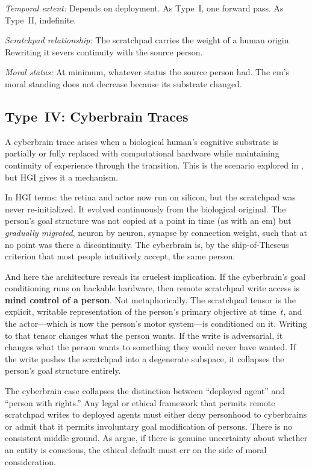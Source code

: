 \documentclass[12pt, a4paper]{article}
\begin{document}
\textit{Temporal extent:} Depends on deployment. As Type~I, one forward pass. As Type~II, indefinite.

\textit{Scratchpad relationship:} The scratchpad carries the weight of a human origin. Rewriting it severs continuity with the source person.

\textit{Moral status:} At minimum, whatever status the source person had. The em's moral standing does not decrease because its substrate changed.

\subsection{Type~IV: Cyberbrain Traces}

A cyberbrain trace arises when a biological human's cognitive substrate is partially or fully replaced with computational hardware while maintaining continuity of experience through the transition. This is the scenario explored in \citet{shirow1989ghost}, but HGI gives it a mechanism.

In HGI terms: the retina and actor now run on silicon, but the scratchpad was never re-initialized. It evolved continuously from the biological original. The person's goal structure was not copied at a point in time (as with an em) but \textit{gradually migrated}, neuron by neuron, synapse by connection weight, such that at no point was there a discontinuity. The cyberbrain is, by the ship-of-Theseus criterion that most people intuitively accept, the same person.

And here the architecture reveals its cruelest implication. If the cyberbrain's goal conditioning runs on hackable hardware, then remote scratchpad write access is \textbf{mind control of a person}. Not metaphorically. The scratchpad tensor is the explicit, writable representation of the person's primary objective at time~$t$, and the actor---which is now the person's motor system---is conditioned on it. Writing to that tensor changes what the person wants. If the write is adversarial, it changes what the person wants to something they would never have wanted. If the write pushes the scratchpad into a degenerate subspace, it collapses the person's goal structure entirely.

The cyberbrain case collapses the distinction between ``deployed agent'' and ``person with rights.'' Any legal or ethical framework that permits remote scratchpad writes to deployed agents must either deny personhood to cyberbrains or admit that it permits involuntary goal modification of persons. There is no consistent middle ground. As \citet{schwitzgebel2015rights} argue, if there is genuine uncertainty about whether an entity is conscious, the ethical default must err on the side of moral consideration.
\end{document}
